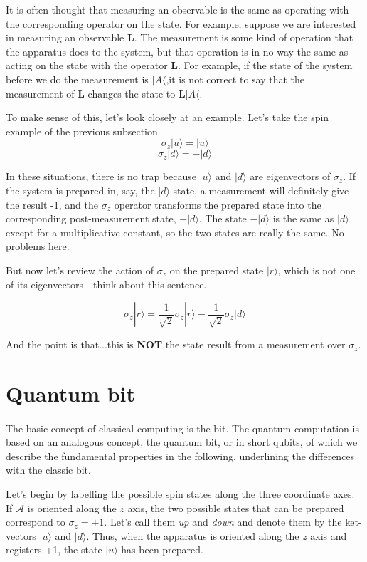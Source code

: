 \documentclass[a4paper,10pt]{article}
\begin{document}
It is often thought that measuring an observable is the same as operating with the corresponding operator on the state. For example, suppose we are interested in measuring an observable $\mathbf{L}$. The measurement is some kind of operation that the apparatus does to the system, but that operation is in no way the same as acting on the state with the operator $\mathbf{L}$. For example, if the state of the system before we do the measurement is $|A\langle$,it is not correct to say that the measurement of $\mathbf{L}$ changes the state to $\mathbf{L}|A\langle$.

To make sense of this, let's look closely at an example. Let's take the spin example of the previous subsection
$$\sigma_z|u\rangle = |u\rangle$$
$$\sigma_z|d\rangle = -|d\rangle$$

In these situations, there is no trap because $|u\rangle$ and $|d\rangle$ are eigenvectors of $\sigma_z$. If the system is prepared in, say, the $|d\rangle$ state, a measurement will definitely give the result -1, and the $\sigma_{z}$ operator transforms the prepared state into the corresponding post-measurement state, $-|d\rangle$. The state $-|d\rangle$ is the same as $|d\rangle$ except for a multiplicative constant, so the two states are really the same. No problems here. 

But now let's review the action of $\sigma_{z}$ on the prepared state $|r\rangle$, which is not one of its eigenvectors - think about this sentence.

$$\sigma_z|r\rangle = \frac{1}{\sqrt{2}}\sigma_z|r\rangle - \frac{1}{\sqrt{2}}\sigma_z|d\rangle$$

And the point is that...this is \textbf{NOT} the state result from a measurement over $\sigma_z$.

\newpage

\section{Quantum bit}
\label{sec:quantumBit}
\paragraph{} The basic concept of classical computing is the bit. The quantum computation is based on an analogous concept, the quantum bit, or in short qubits, of which we describe the fundamental properties in the following, underlining the differences with the classic bit.

Let's begin by labelling the possible spin states along the three coordinate axes. If $\mathcal{A}$ is oriented along the $z$ axis, the two possible states that can be prepared correspond to $\sigma_z = \pm 1$. Let's call them \textit{up} and \textit{down} and denote them by the ket-vectors $|u\rangle$ and $|d\rangle$. Thus, when the apparatus is oriented along the $z$ axis and registers +1, the state $|u\rangle$ has been prepared.
\end{document}
